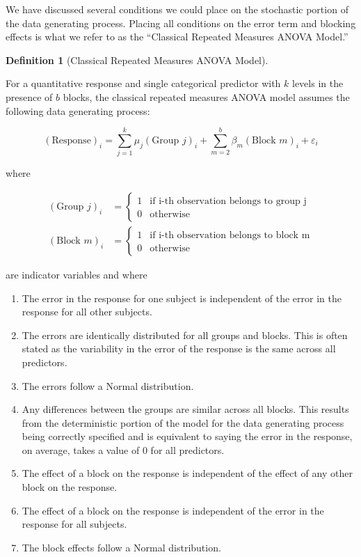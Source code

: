 \documentclass[
  letterpaper,
  DIV=11,
  numbers=noendperiod]{scrreprt}
\providecommand{\tightlist}{%
  \setlength{\itemsep}{0pt}\setlength{\parskip}{0pt}}\usepackage{longtable,booktabs,array}
\theoremstyle{plain}
\theoremstyle{definition}
\theoremstyle{definition}
\newtheorem{definition}{Definition}[chapter]
\theoremstyle{remark}
\begin{document}
We have discussed several conditions we could place on the stochastic
portion of the data generating process. Placing all conditions on the
error term and blocking effects is what we refer to as the ``Classical
Repeated Measures ANOVA Model.''

\begin{definition}[Classical Repeated Measures ANOVA
Model]\protect\hypertarget{def-classical-repeated-measures-anova}{}\label{def-classical-repeated-measures-anova}

For a quantitative response and single categorical predictor with \(k\)
levels in the presence of \(b\) blocks, the classical repeated measures
ANOVA model assumes the following data generating process:

\[(\text{Response})_i = \sum_{j=1}^{k} \mu_j (\text{Group } j)_i + \sum_{m=2}^{b} \beta_m (\text{Block } m)_i + \varepsilon_i\]

where

\[
\begin{aligned}
  (\text{Group } j)_{i} &= \begin{cases}
    1 & \text{if i-th observation belongs to group j} \\
    0 & \text{otherwise}
    \end{cases} \\
  (\text{Block } m)_{i} &= \begin{cases}
    1 & \text{if i-th observation belongs to block m} \\
    0 & \text{otherwise}
    \end{cases}
\end{aligned}
\]

are indicator variables and where

\begin{enumerate}
\def\labelenumi{\arabic{enumi}.}
\tightlist
\item
  The error in the response for one subject is independent of the error
  in the response for all other subjects.
\item
  The errors are identically distributed for all groups and blocks. This
  is often stated as the variability in the error of the response is the
  same across all predictors.
\item
  The errors follow a Normal distribution.
\item
  Any differences between the groups are similar across all blocks. This
  results from the deterministic portion of the model for the data
  generating process being correctly specified and is equivalent to
  saying the error in the response, on average, takes a value of 0 for
  all predictors.
\item
  The effect of a block on the response is independent of the effect of
  any other block on the response.
\item
  The effect of a block on the response is independent of the error in
  the response for all subjects.
\item
  The block effects follow a Normal distribution.
\end{enumerate}


\end{definition}
\end{document}
